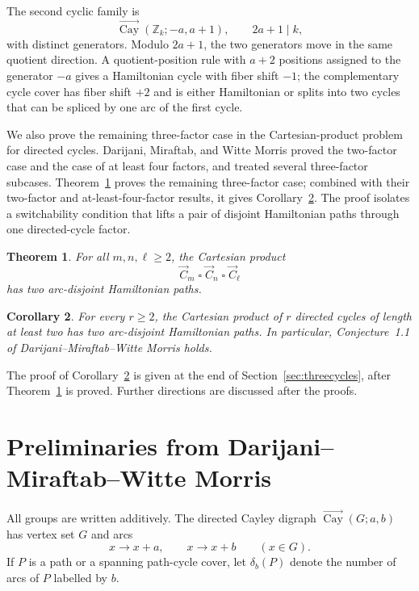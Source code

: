 \documentclass[11pt]{article}
\newtheorem{theorem}{Theorem}[section]
\newtheorem{corollary}[theorem]{Corollary}
\newcommand{\Cay}{\overrightarrow{\operatorname{Cay}}}
\newcommand{\Z}{\mathbb Z}
\newcommand{\Boxprod}{\mathbin{\square}}
\begin{document}
The second cyclic family is
\[
        \Cay(\Z_k;-a,a+1),
        \qquad 2a+1\mid k,
\]
with distinct generators.  Modulo $2a+1$, the two generators move in the same quotient direction.  A quotient-position rule with $a+2$ positions assigned to the generator $-a$ gives a Hamiltonian cycle with fiber shift $-1$; the complementary cycle cover has fiber shift $+2$ and is either Hamiltonian or splits into two cycles that can be spliced by one arc of the first cycle.

We also prove the remaining three-factor case in the Cartesian-product problem for directed cycles.  Darijani, Miraftab, and Witte Morris proved the two-factor case and the case of at least four factors, and treated several three-factor subcases.  Theorem~\ref{thm:threecycles} proves the remaining three-factor case; combined with their two-factor and at-least-four-factor results, it gives Corollary~\ref{cor:all-cycle-products}.  The proof isolates a switchability condition that lifts a pair of disjoint Hamiltonian paths through one directed-cycle factor.

\begin{theorem}\label{thm:threecycles}
For all $m,n,\ell\ge2$, the Cartesian product
\[
        \vec C_m\Boxprod \vec C_n\Boxprod \vec C_\ell
\]
has two arc-disjoint Hamiltonian paths.
\end{theorem}

\begin{corollary}\label{cor:all-cycle-products}
For every $r\ge2$, the Cartesian product of $r$ directed cycles of length at least two has two arc-disjoint Hamiltonian paths.  In particular, Conjecture~1.1 of Darijani--Miraftab--Witte Morris holds.
\end{corollary}

The proof of Corollary~\ref{cor:all-cycle-products} is given at the end of Section~\ref{sec:threecycles}, after Theorem~\ref{thm:threecycles} is proved.  Further directions are discussed after the proofs.


\section{Preliminaries from Darijani--Miraftab--Witte Morris}

All groups are written additively.  The directed Cayley digraph $\Cay(G;a,b)$ has vertex set $G$ and arcs
\[
        x\to x+a,
        \qquad
        x\to x+b
        \qquad (x\in G).
\]
If $P$ is a path or a spanning path-cycle cover, let $\delta_b(P)$ denote the number of arcs of $P$ labelled by $b$.
\end{document}
